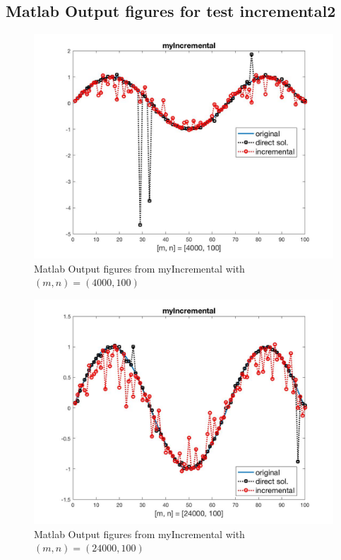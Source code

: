 \subsection*{Matlab Output figures for test incremental2}
\begin{figure}[H]
\centering
\includegraphics[width=12cm]{f_7}
\caption{Matlab Output figures from myIncremental with$(m,n)=(4000,100)$}
\end{figure}
\begin{figure}[H]
\centering
\includegraphics[width=12cm]{f_8}
\caption{Matlab Output figures from myIncremental with$(m,n)=(24000,100)$}
\end{figure}
